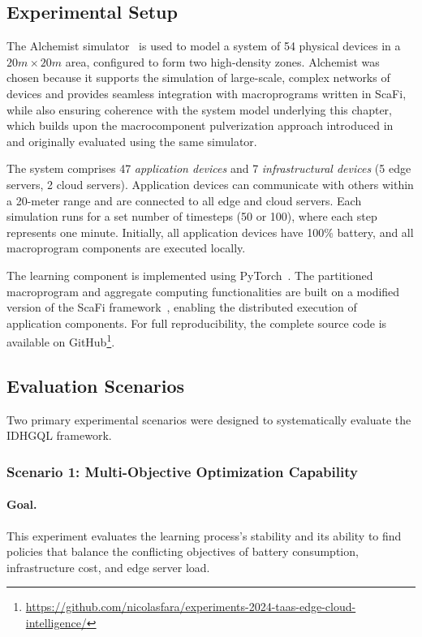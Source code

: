 \subsection{Experimental Setup}\label{sec:experimental-setup}
The Alchemist simulator~\cite{DBLP:journals/jos/PianiniMV13} is used 
 to model a system of 54 physical devices in a $20m \times 20m$ area, 
 configured to form two high-density zones. 
%
Alchemist was chosen because it supports the simulation of large-scale, 
 complex networks of devices and provides seamless integration with macroprograms written in ScaFi, 
 while also ensuring coherence with the system model underlying this chapter, 
 which builds upon the macrocomponent pulverization approach introduced in~\cite{acsos-model}
 and originally evaluated using the same simulator.

% 
The system comprises 47 \emph{application devices} and 7 \emph{infrastructural devices} (5 edge servers, 2 cloud servers). 
 Application devices can communicate with others within a 20-meter range and are connected to all edge and cloud servers. 
 Each simulation runs for a set number of timesteps (50 or 100), where each step represents one minute.
 Initially, all application devices have 100\% battery, and all macroprogram components are executed locally.

The learning component is implemented using PyTorch~\cite{paszke2017automatic}. 
 The partitioned macroprogram and aggregate computing functionalities are built 
 on a modified version of the ScaFi framework~\cite{DBLP:journals/softx/CasadeiVAP22}, 
 enabling the distributed execution of application components. 
 For full reproducibility, 
 the complete source code is available on GitHub\footnote{\url{https://github.com/nicolasfara/experiments-2024-taas-edge-cloud-intelligence/}}.

\subsection{Evaluation Scenarios}
Two primary experimental scenarios were designed to systematically evaluate the IDHGQL framework.
\subsubsection{Scenario 1: Multi-Objective Optimization Capability} \label{sec:sanity-check}
\paragraph{Goal.} This experiment evaluates the learning process's stability 
 and its ability to find policies that balance the conflicting objectives of battery consumption,
 infrastructure cost, and edge server load.

